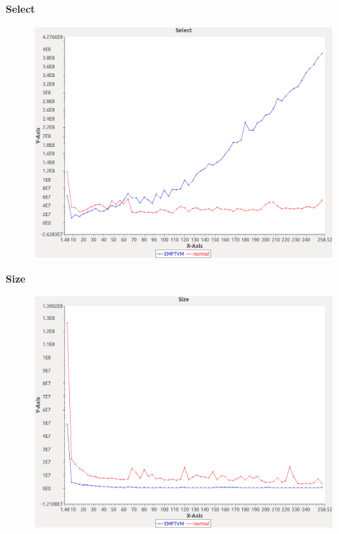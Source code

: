 \noindent\textbf{Select}

\begin{figure}[h]
\centering
\includegraphics[width=\textwidth]{graphs/orderedset/Select}
\end{figure}
\pagebreak

\noindent\textbf{Size}

\begin{figure}[h]
\centering
\includegraphics[width=\textwidth]{graphs/orderedset/Size}
\end{figure}
\pagebreak

